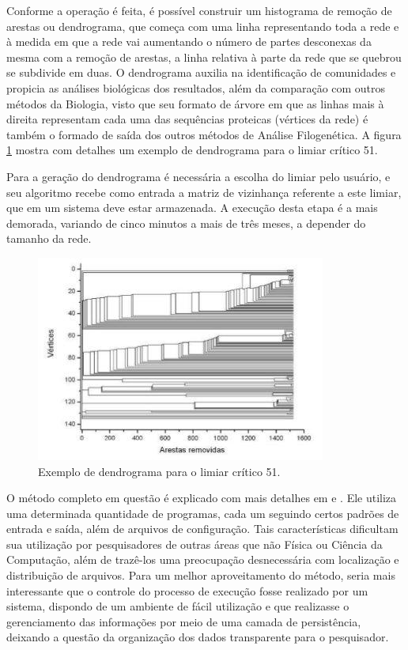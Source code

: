 Conforme a operação é feita, é possível construir um histograma de remoção de arestas ou dendrograma, que começa com uma linha representando toda a rede
e à medida em que a rede vai aumentando o número de partes desconexas da mesma com a remoção de arestas, a linha relativa à parte da rede que se quebrou
se subdivide em duas. O dendrograma auxilia na identificação de comunidades e propicia as análises biológicas dos resultados, além da comparação com outros
métodos da Biologia, visto que seu formato de árvore em que as linhas mais à direita representam cada uma das sequências proteicas (vértices da rede)
é também o formado de saída dos outros métodos de Análise Filogenética. A figura \ref{fig:dendrograma} mostra com detalhes um exemplo de dendrograma
para o limiar crítico 51.\newline

Para a geração do dendrograma é necessária a escolha do limiar pelo usuário, e seu algoritmo recebe como entrada a matriz de vizinhança referente a este
limiar, que em um sistema deve estar armazenada. A execução desta etapa é a mais demorada, variando de cinco minutos a mais de três meses, a depender do
tamanho da rede. 

\begin{figure}
\centering
\includegraphics[scale=0.73]{dendrograma}
\caption{Exemplo de dendrograma para o limiar crítico 51.}
\label{fig:dendrograma}
\end{figure}

O método completo em questão é explicado com mais detalhes em \cite{goesneto2010} e \cite{andrade2011}. Ele utiliza uma determinada quantidade de programas,
cada um seguindo certos padrões de entrada e saída, além de arquivos de configuração.
Tais características dificultam sua utilização por pesquisadores de outras áreas que não Física ou Ciência da Computação, além de trazê-los uma preocupação
desnecessária com localização e distribuição de arquivos. Para um melhor aproveitamento do método, seria mais interessante que o controle do processo de
execução fosse realizado por um sistema, dispondo de um ambiente de fácil utilização e que realizasse o gerenciamento das informações por meio de uma camada
de persistência, deixando a questão da organização dos dados transparente para o pesquisador.

